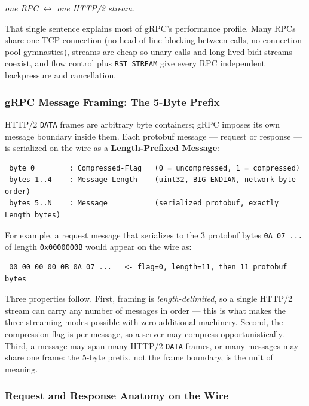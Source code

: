 \begin{center}
\emph{one RPC} $\longleftrightarrow$ \emph{one HTTP/2 stream}.
\end{center}

That single sentence explains most of gRPC's performance profile. Many RPCs
share one TCP connection (no head-of-line blocking between calls, no
connection-pool gymnastics), streams are cheap so unary calls and long-lived
bidi streams coexist, and flow control plus \texttt{RST\_STREAM} give every RPC
independent backpressure and cancellation.

\subsubsection{gRPC Message Framing: The 5-Byte Prefix}
\label{subsubsec:ch13-framing}

HTTP/2 \texttt{DATA} frames are arbitrary byte containers; gRPC imposes its own
message boundary inside them. Each protobuf message --- request or response ---
is serialized on the wire as a \textbf{Length-Prefixed Message}:

\begin{verbatim}
 byte 0        : Compressed-Flag   (0 = uncompressed, 1 = compressed)
 bytes 1..4    : Message-Length    (uint32, BIG-ENDIAN, network byte order)
 bytes 5..N    : Message           (serialized protobuf, exactly Length bytes)
\end{verbatim}

For example, a request message that serializes to the 3 protobuf bytes
\texttt{0A 07 ... } of length \texttt{0x0000000B} would appear on the wire as:

\begin{verbatim}
 00 00 00 00 0B 0A 07 ...   <- flag=0, length=11, then 11 protobuf bytes
\end{verbatim}

Three properties follow. First, framing is \emph{length-delimited}, so a single
HTTP/2 stream can carry any number of messages in order --- this is what makes
the three streaming modes possible with zero additional machinery. Second, the
compression flag is per-message, so a server may compress opportunistically.
Third, a message may span many HTTP/2 \texttt{DATA} frames, or many messages may
share one frame: the 5-byte prefix, not the frame boundary, is the unit of
meaning.

\subsubsection{Request and Response Anatomy on the Wire}
\label{subsubsec:ch13-anatomy}

